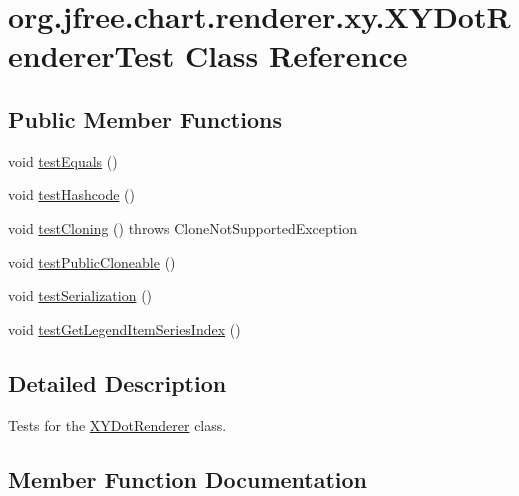 \hypertarget{classorg_1_1jfree_1_1chart_1_1renderer_1_1xy_1_1_x_y_dot_renderer_test}{}\section{org.\+jfree.\+chart.\+renderer.\+xy.\+X\+Y\+Dot\+Renderer\+Test Class Reference}
\label{classorg_1_1jfree_1_1chart_1_1renderer_1_1xy_1_1_x_y_dot_renderer_test}
\subsection*{Public Member Functions}
\begin{DoxyCompactItemize}
\item 
void \mbox{\hyperlink{classorg_1_1jfree_1_1chart_1_1renderer_1_1xy_1_1_x_y_dot_renderer_test_a8d498123bf8f00621910ae91485918f3}{test\+Equals}} ()
\item 
void \mbox{\hyperlink{classorg_1_1jfree_1_1chart_1_1renderer_1_1xy_1_1_x_y_dot_renderer_test_a1fd304ee6436cae467d6d08092d3ba78}{test\+Hashcode}} ()
\item 
void \mbox{\hyperlink{classorg_1_1jfree_1_1chart_1_1renderer_1_1xy_1_1_x_y_dot_renderer_test_a5f155a9f723064b1440262822ad7c225}{test\+Cloning}} ()  throws Clone\+Not\+Supported\+Exception 
\item 
void \mbox{\hyperlink{classorg_1_1jfree_1_1chart_1_1renderer_1_1xy_1_1_x_y_dot_renderer_test_ac3b52c4e8d741784b3436d14fb29543a}{test\+Public\+Cloneable}} ()
\item 
void \mbox{\hyperlink{classorg_1_1jfree_1_1chart_1_1renderer_1_1xy_1_1_x_y_dot_renderer_test_a82f3c5fcb8139deda9e08fdb0e4c7ca0}{test\+Serialization}} ()
\item 
void \mbox{\hyperlink{classorg_1_1jfree_1_1chart_1_1renderer_1_1xy_1_1_x_y_dot_renderer_test_a93d2296d146661507277c5290b818c93}{test\+Get\+Legend\+Item\+Series\+Index}} ()
\end{DoxyCompactItemize}


\subsection{Detailed Description}
Tests for the \mbox{\hyperlink{classorg_1_1jfree_1_1chart_1_1renderer_1_1xy_1_1_x_y_dot_renderer}{X\+Y\+Dot\+Renderer}} class. 

\subsection{Member Function Documentation}
\mbox{\label{classorg_1_1jfree_1_1chart_1_1renderer_1_1xy_1_1_x_y_dot_renderer_test_a5f155a9f723064b1440262822ad7c225}} 
